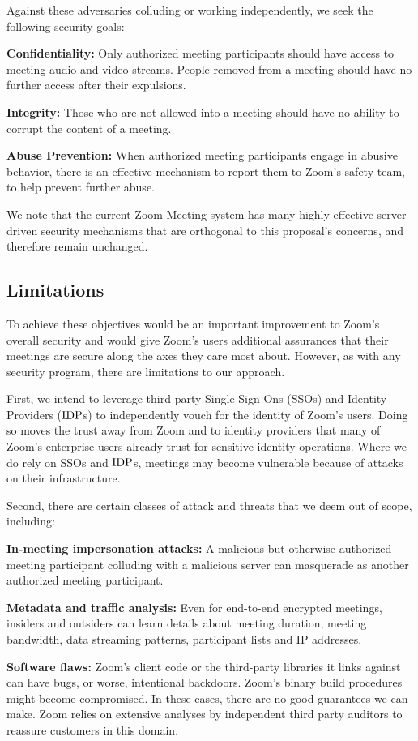 Against these adversaries colluding or working independently, we seek the following security goals:

\begin{description}
	\item {\bf Confidentiality:} Only authorized meeting participants should have access to meeting audio and video streams. People removed from a meeting should have no further access after their expulsions.
	\item {\bf Integrity:} Those who are not allowed into a meeting should have no ability to corrupt the content of a meeting.
	\item {\bf Abuse Prevention:} When authorized meeting participants engage in abusive behavior, there is an effective mechanism to report them to Zoom's safety team, to help prevent further abuse.
\end{description}

We note that the current Zoom Meeting system has many highly-effective server-driven security mechanisms that are orthogonal to this proposal's concerns, and therefore remain unchanged.

\subsection{Limitations}
To achieve these objectives would be an important improvement to Zoom's overall security and would give Zoom's users additional assurances that their meetings are secure along the axes they care most about. However, as with any security program, there are limitations to our approach.

First, we intend to leverage third-party Single Sign-Ons (SSOs) and Identity Providers ($\mathrm{IDP}$s) to independently vouch for the identity of Zoom's users. Doing so moves the trust away from Zoom and to identity providers that many of Zoom's enterprise users already trust for sensitive identity operations. Where we do rely on SSOs and $\mathrm{IDP}$s, meetings may become vulnerable because of attacks on their infrastructure.

Second, there are certain classes of attack and threats that we deem out of scope, including:

\begin{description}
	\item {\bf In-meeting impersonation attacks:} A malicious but otherwise authorized meeting participant colluding with a malicious server can masquerade as another authorized meeting participant.
	\item {\bf Metadata and traffic analysis:} Even for end-to-end encrypted meetings, insiders and outsiders can learn details about meeting duration, meeting bandwidth, data streaming patterns, participant lists and IP addresses.
	\item {\bf Software flaws:} Zoom's client code or the third-party libraries it links against can have bugs, or worse, intentional backdoors. Zoom's binary build procedures might become compromised. In these cases, there are no good guarantees we can make. Zoom relies on extensive analyses by independent third party auditors to reassure customers in this domain.
\end{description}

